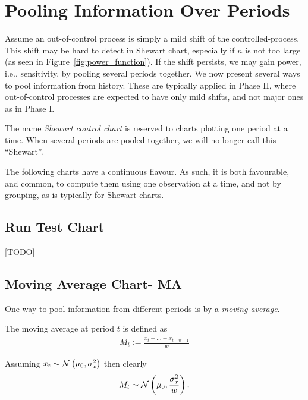 \section{Pooling Information Over Periods}
\label{sec:running_windows}

Assume an out-of-control process is simply a mild shift of the controlled-process.
This shift may be hard to detect in Shewart chart, especially if $n$ is not too large (as seen in Figure~\ref{fig:power_function}).  
If the shift persists, we may gain power, i.e., sensitivity, by pooling several periods together. 
We now present several ways to pool information from history. These are typically applied in Phase II, where out-of-control processes are expected to have only mild shifts, and not major ones as in Phase I. 

\begin{remark}
The name \emph{Shewart control chart} is reserved to charts plotting one period at a time. 
When several periods are pooled together, we will no longer call this  ``Shewart''.
\end{remark}

\begin{remark}
The following charts have a continuous flavour. As such, it is both favourable, and common, to compute them using one observation at a time, and not by grouping, as is typically for Shewart charts. 
\end{remark}



\subsection{Run Test Chart}
[TODO]




\subsection{Moving Average Chart- MA}
One way to pool information from different periods is by a \emph{moving average}.
\begin{definition}
The moving average at period $t$ is defined as
\begin{align}
	M_t:= \frac{x_t+\dots+x_{t-w+1}}{w}
\end{align}
\end{definition}
Assuming $x_t \sim \mathcal{N}\left(\mu_0, \sigma_x^2\right)$ then clearly 
\begin{align}
	M_t \sim \mathcal{N}\left(\mu_0, \frac{\sigma_x^2}{w}\right).
\end{align}

